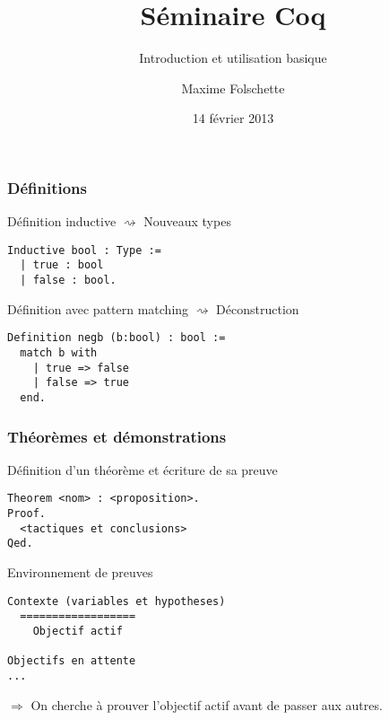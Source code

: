 \documentclass[9pt]{beamer}
\title{Séminaire Coq}
\subtitle{Introduction et utilisation basique}
\author{Maxime Folschette}
\date{14 février 2013}
\newenvironment{code}[1][Code]{\begin{block}{#1}}{\end{block}}
\begin{document}
\begin{frame}[plain]
\titlepage
\end{frame}



\begin{frame}[containsverbatim]
\frametitle{Définitions}

\begin{code}[Définition inductive $\rightsquigarrow$ Nouveaux types]
\begin{lstlisting}
Inductive bool : Type :=
  | true : bool
  | false : bool.
\end{lstlisting}
\end{code}

\begin{code}[Définition avec pattern matching $\rightsquigarrow$ Déconstruction]
\begin{lstlisting}
Definition negb (b:bool) : bool :=
  match b with
    | true => false
    | false => true
  end.
\end{lstlisting}
\end{code}

\end{frame}



\begin{frame}[containsverbatim]
\frametitle{Théorèmes et démonstrations}

\begin{code}[Définition d'un théorème et écriture de sa preuve]
\begin{lstlisting}
Theorem <nom> : <proposition>.
Proof.
  <tactiques et conclusions>
Qed.
\end{lstlisting}
\end{code}

\begin{code}[Environnement de preuves]
\begin{lstlisting}[]
  Contexte (variables et hypotheses)
  ==================
    Objectif actif

Objectifs en attente
...
\end{lstlisting}
\end{code}

$\Rightarrow$ On cherche à prouver l'objectif actif avant de passer aux autres.

\end{frame}
\end{document}
